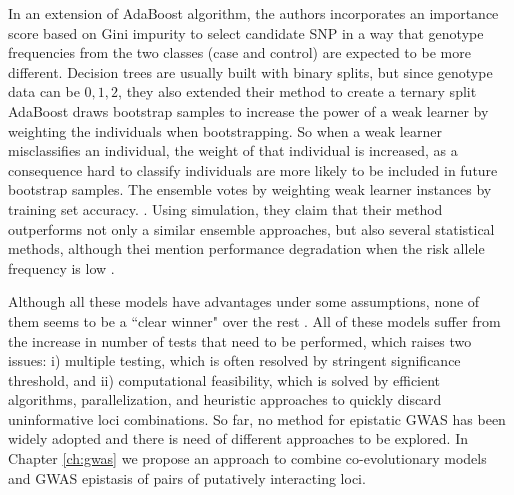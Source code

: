 \begin{enumerate}
In an extension of AdaBoost algorithm, the authors incorporates an importance score based on Gini impurity to select candidate SNP \cite{li2011detecting} in a way that genotype frequencies from the two classes (case and control) are expected to be more different.
Decision trees are usually built with binary splits, but since genotype data can be ${0, 1, 2}$, they also extended their method to create a ternary split
AdaBoost draws bootstrap samples to increase the power of a weak learner by weighting the individuals when bootstrapping. 
So when a weak learner misclassifies an individual, the weight of that individual is increased, as a consequence hard to classify individuals are more likely to be included in future bootstrap samples. 
The ensemble votes by weighting weak learner instances by training set accuracy.  \cite{li2011detecting}.
Using simulation, they claim that their method outperforms not only a similar ensemble approaches, but also several statistical methods, although thei mention performance degradation when the risk allele frequency is low \cite{li2011detecting}.

\end{enumerate}

Although all these models have advantages under some assumptions, none of them seems to be a ``clear winner" over the rest \cite{cordell2009detecting}. 
All of these models suffer from the increase in number of tests that need to be performed, which raises two issues: i) multiple testing, which is often resolved by stringent significance threshold, and ii) computational feasibility, which is solved by efficient algorithms, parallelization, and heuristic approaches to quickly discard uninformative loci combinations. 
So far, no method for epistatic GWAS has been widely adopted and there is need of different approaches to be explored. In Chapter \ref{ch:gwas} we propose an approach to combine co-evolutionary models and GWAS epistasis of pairs of putatively interacting loci.


